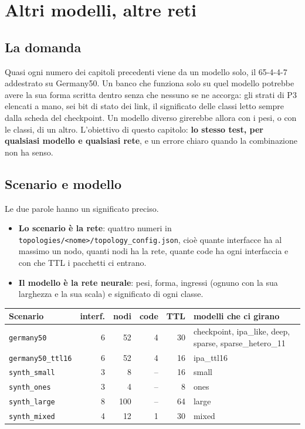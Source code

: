 \documentclass[11pt,a4paper,oneside]{report}
\begin{document}
\chapter{Altri modelli, altre reti}
\label{ch:modelli}

\section{La domanda}

Quasi ogni numero dei capitoli precedenti viene da un modello solo, il 65-4-4-7
addestrato su Germany50. Un banco che funziona solo su quel modello potrebbe
avere la sua forma scritta dentro senza che nessuno se ne accorga: gli strati di
P3 elencati a mano, sei bit di stato dei link, il significato delle classi letto
sempre dalla scheda del checkpoint. Un modello diverso girerebbe allora con i
pesi, o con le classi, di un altro. L'obiettivo di questo capitolo: \textbf{lo
stesso test, per qualsiasi modello e qualsiasi rete}, e un errore chiaro quando
la combinazione non ha senso.

\section{Scenario e modello}

Le due parole hanno un significato preciso.

\begin{itemize}
  \item \textbf{Lo scenario è la rete}: quattro numeri in
        \texttt{topologies/<nome>/topology\_config.json}, cioè quante
        interfacce ha al massimo un nodo, quanti nodi ha la rete, quante code ha
        ogni interfaccia e con che TTL i pacchetti ci entrano.
  \item \textbf{Il modello è la rete neurale}: pesi, forma, ingressi (ognuno con
        la sua larghezza e la sua scala) e significato di ogni classe.
\end{itemize}

\begin{center}
\small
\begin{tabular}{@{}lrrrrp{4.6cm}@{}}
\toprule
\textbf{Scenario} & \textbf{interf.} & \textbf{nodi} & \textbf{code} & \textbf{TTL} & \textbf{modelli che ci girano} \\
\midrule
\texttt{germany50}       & 6 & 52  & 4 & 30 & checkpoint, ipa\_like, deep, sparse, sparse\_hetero\_11 \\
\texttt{germany50\_ttl16} & 6 & 52  & 4 & 16 & ipa\_ttl16 \\
\texttt{synth\_small}    & 3 & 8   & -- & 16 & small \\
\texttt{synth\_ones}     & 3 & 4   & -- & 8  & ones \\
\texttt{synth\_large}    & 8 & 100 & -- & 64 & large \\
\texttt{synth\_mixed}    & 4 & 12  & 1 & 30 & mixed \\
\bottomrule
\end{tabular}
\end{center}
\end{document}
